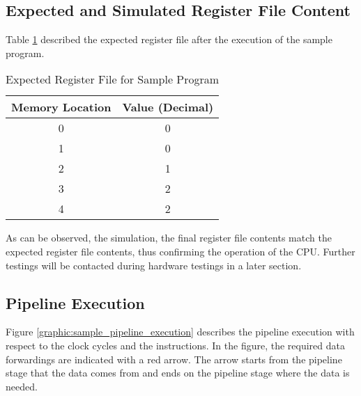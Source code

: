 \subsection{Expected and Simulated Register File Content}
Table \ref{table:expected_rf} described the expected register file after the execution of the sample program.
\begin{table}[]
    \centering
    \caption{Expected Register File for Sample Program}
    \label{table:expected_rf}
    \begin{tabular}{|c|c|}
        \hline
        \textbf{Memory Location} & \textbf{Value (Decimal)} \\ \hline
        0                        & 0                        \\ \hline
        1                        & 0                        \\ \hline
        2                        & 1                        \\ \hline
        3                        & 2                        \\ \hline
        4                        & 2                        \\ \hline
    \end{tabular}
\end{table}


As can be observed, the simulation, the final register file contents match the expected register file contents, thus confirming the operation of the CPU.
Further testings will be contacted during hardware testings in a later section.

\newpage
\subsection{Pipeline Execution}
Figure \ref{graphic:sample_pipeline_execution} describes the pipeline execution with respect to the clock cycles and the instructions.
In the figure, the required data forwardings are indicated with a red arrow.
The arrow starts from the pipeline stage that the data comes from and ends on the pipeline stage where the data is needed.

